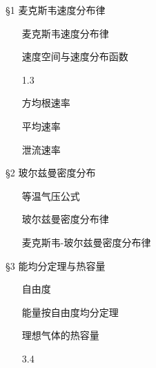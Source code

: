 \documentclass[CJK]{beamer}
\begin{document}
\begin{frame}
\bch
\S{1} 麦克斯韦速度分布律
\begin{itemize}
\item[\blacktext{1.1}]{麦克斯韦速度分布律}
\item[\blacktext{1.2}]{速度空间与速度分布函数}
\item[1.3]{}
\item[\blacktext{1.4}]{方均根速率}
\item[\blacktext{1.5}]{平均速率}
\item[\blacktext{1.6}]{泄流速率}
\end{itemize}

\S{2} 玻尔兹曼密度分布
\begin{itemize}
\item[\blacktext{2.1}]{等温气压公式}
\item[\blacktext{2.2}]{玻尔兹曼密度分布律}
\item[\blacktext{2.3}]{麦克斯韦-玻尔兹曼密度分布律}
\end{itemize}
\ech
\end{frame}

\begin{frame}
\bch
\S{3} 能均分定理与热容量
\begin{itemize}
\item[\blacktext{3.1}]{自由度}
\item[\blacktext{3.2}]{能量按自由度均分定理}
\item[\blacktext{3.3}]{理想气体的热容量}
\item[3.4]{}
\end{itemize}


\begin{itemize}
\item[\cyantext{4.1}]{}
\item[\cyantext{4.2}]{}
\item[\cyantext{4.3}]{}
\item[\cyantext{4.4}]{}
\item[\greentext{4.5}]{}
\end{itemize}

\ech
\end{frame}
\end{document}
